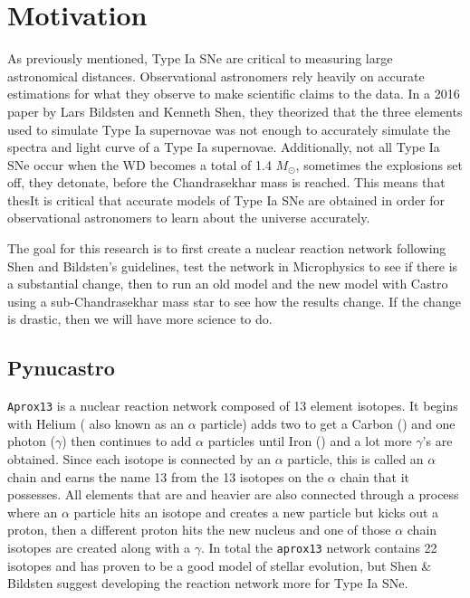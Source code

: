 \documentclass[preprint]{aastex62}
\begin{document}
\section{Motivation}
  
  As previously mentioned, Type Ia SNe are critical to measuring large astronomical distances. Observational astronomers rely heavily on accurate estimations for what they observe to make scientific claims to the data. In a 2016 paper by Lars Bildsten and Kenneth Shen, they theorized that the three elements used to simulate Type Ia supernovae was not enough to accurately simulate the spectra and light curve of a Type Ia supernovae. %
  Additionally, not all Type Ia SNe occur when the WD becomes a total of 1.4 $M_{\odot}$, sometimes the explosions set off, they detonate, before the Chandrasekhar mass is reached. This means that thesIt is critical that accurate models of Type Ia SNe are obtained in order for observational astronomers to learn about the universe accurately. 
  
  The goal for this research is to first create a nuclear reaction network following Shen and Bildsten's guidelines, test the network in Microphysics to see if there is a substantial change, then to run an old model and the new model with Castro using a sub-Chandrasekhar mass star to see how the results change. If the change is drastic, then we will have more science to do. 
  
  \subsection{Pynucastro}
    
    {\tt Aprox13} is a nuclear reaction network composed of 13 element isotopes. It begins with Helium ( also known as an $\alpha$ particle) adds two  to get a Carbon () and one photon ($\gamma$) then continues to add $\alpha$ particles until Iron () and a lot more $\gamma$'s are obtained. Since each isotope is connected by an $\alpha$ particle, this is called an $\alpha$ chain and earns the name 13 from the 13 isotopes on the $\alpha$ chain that it possesses. All elements that are  and heavier are also connected through a process where an $\alpha$ particle hits an isotope and creates a new particle but kicks out a proton, then a different proton hits the new nucleus and one of those $\alpha$ chain isotopes are created along with a $\gamma$. In total the {\tt aprox13} network contains 22 isotopes and has proven to be a good model of stellar evolution, but Shen \& Bildsten suggest developing the reaction network more for Type Ia SNe. %
    
\end{document}
